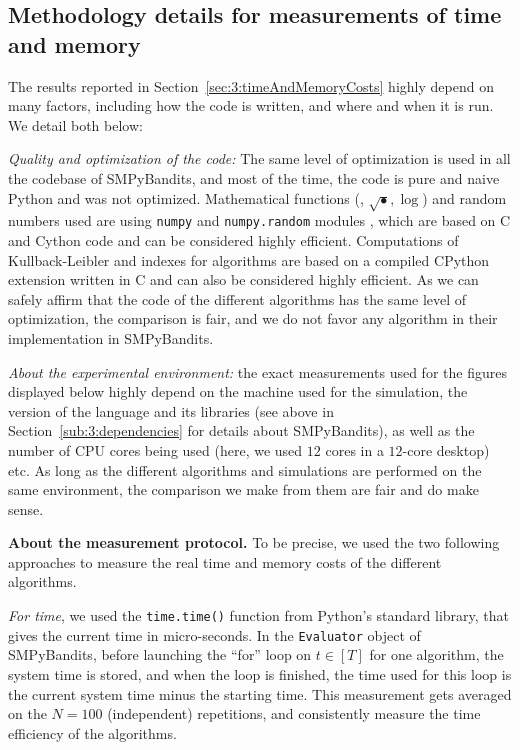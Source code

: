 \subsection{Methodology details for measurements of time and memory}
\label{sub:3:precautionsTimeMemory}

The results reported in Section~\ref{sec:3:timeAndMemoryCosts} highly depend on many factors, including how the code is written, and where and when it is run.
We detail both below:

    \emph{Quality and optimization of the code:}
    The same level of optimization is used in all the codebase of SMPyBandits, and most of the time, the code is pure and naive Python and was not optimized.
    Mathematical functions (\eg, $\sqrt{\bullet}, \log$) and random numbers used are using \texttt{numpy} and \texttt{numpy.random} modules \cite{numpy}, which are based on C and Cython code \cite{cython} and can be considered highly efficient.
    Computations of Kullback-Leibler and indexes for \klUCB{} algorithms are based on a compiled CPython extension written in C \cite{python} and can also be considered highly efficient.
    As we can safely affirm that the code of the different algorithms has the same level of optimization, the comparison is fair, and we do not favor any algorithm in their implementation in SMPyBandits.

    \emph{About the experimental environment:}
    the exact measurements used for the figures displayed below highly depend on the machine used for the simulation, the version of the language and its libraries (see above in Section~\ref{sub:3:dependencies} for details about SMPyBandits), as well as the number of CPU cores being used (here, we used $12$ cores in a $12$-core desktop) etc.
    As long as the different algorithms and simulations are performed on the same environment, the comparison we make from them are fair and do make sense.


\textbf{About the measurement protocol.}
%
To be precise, we used the two following approaches to measure the real time and memory costs of the different algorithms.

    \emph{For time}, we used the \texttt{time.time()} function from Python's standard library, that gives the current time in micro-seconds.
    In the \texttt{Evaluator} object of SMPyBandits, before launching the ``for'' loop on $t\in[T]$ for one algorithm, the system time is stored, and when the loop is finished, the time used for this loop is the current system time minus the starting time.
    This measurement gets averaged on the $N=100$ (independent) repetitions, and consistently measure the time efficiency of the algorithms.

